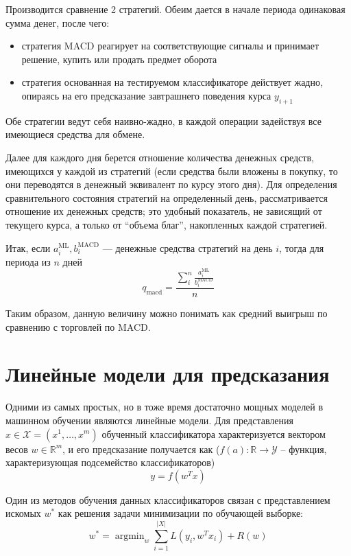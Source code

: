 \documentclass[pdftex,ptm,14pt,a4paper]{extreport}
\DeclareMathOperator*{\argmin}{argmin}
\begin{document}
Производится сравнение 2 стратегий. Обеим дается в начале периода одинаковая сумма денег, после чего:
\begin{itemize}
\item стратегия MACD реагирует на соответствующие сигналы и принимает решение, купить или продать предмет оборота
\item стратегия основанная на тестируемом классификаторе действует жадно, опираясь на его предсказание завтрашнего
поведения курса $y_{i+1}$
\end{itemize}
Обе стратегии ведут себя наивно-жадно, в каждой операции задействуя все имеющиеся средства для обмене.

Далее для каждого дня берется отношение количества денежных средств, имеющихся у каждой из стратегий (если средства были
вложены в покупку, то они переводятся в денежный эквивалент по курсу этого дня). Для определения сравнительного состояния
стратегий на определенный день, рассматривается отношение их денежных средств; это удобный показатель, не зависящий
от текущего курса, а только от ``объема благ'', накопленных каждой стратегией.

Итак, если $a^{\text{ML}}_i, b^{\text{MACD}}_i$ --- денежные средства стратегий на день $i$, тогда для периода из $n$ дней
\begin{equation}
q_\text{macd} = \frac{\sum_i^n \frac{a^{\text{ML}}_i}{b^{\text{MACD}}_i}}{n}
\end{equation}

Таким образом, данную величину можно понимать как средний выигрыш по сравнению с торговлей по MACD.

\section{Линейные модели для предсказания}

Одними из самых простых, но в тоже время достаточно мощных моделей в машинном обучении являются линейные модели\cite{linear_cls}.
Для представления $x\in\mathcal{X}=(x^1,\ldots,x^m)$ обученный классификатора характеризуется вектором весов $w\in\mathbb{R}^m$,
и его предсказание получается как ($f(a) : \mathbb{R}\to\mathcal{Y}$ -- функция,
характеризующая подсемейство классификаторов)
\begin{equation}
y=f(w^Tx)
\end{equation}

Один из методов обучения данных классификаторов связан с представлением искомых $w^*$ как решения задачи минимизации
по обучающей выборке:
\begin{equation}
w^*=\argmin_w \sum_{i=1}^{|X|} L(y_i,w^Tx_i) + R(w)
\end{equation}
\end{document}
